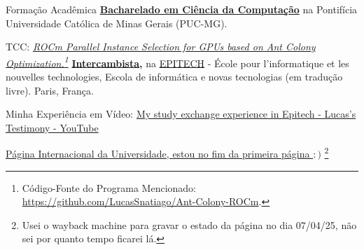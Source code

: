 \begin{rubric}{Formação Acadêmica}
\entry*[2019 -- 2023]%
    \textbf{\href{https://drive.google.com/file/d/1c2m8jONNZnZUBY8lnjcAZ_gO1ZWcIsyu/view?usp=sharing}{Bacharelado em Ciência da Computação}} na Pontifícia Universidade Católica de Minas Gerais (PUC-MG).
    \par TCC: \emph{\href{https://media.githubusercontent.com/media/LucasSnatiago/TCC/main/main.pdf}
    {ROCm Parallel Instance Selection for GPUs based on Ant Colony Optimization.}\footnote{Código-Fonte do Programa Mencionado: \href{https://github.com/LucasSnatiago/Ant-Colony-ROCm}{https://github.com/LucasSnatiago/Ant-Colony-ROCm}.}}
%
\entry*[2023/1]%
    \textbf{\href{https://drive.google.com/file/d/18yGVDfS8qOwmM7TXN-m8jqI3r0iMvm-3/view?usp=sharing}{Intercambista},} na \href{https://epitech.eu/}{EPITECH} - École pour l'informatique et les nouvelles technologies, Escola de informática e novas tecnologias (em tradução livre). Paris, França. \par
    Minha Experiência em Vídeo: \href{https://youtu.be/rOP5lxGcNaE}{My study exchange experience in Epitech - Lucas's Testimony - YouTube} \par
    \href{https://web.archive.org/web/20250407145959/https://international.epitech.eu/#h-voices-of-our-international-students}{Página Internacional da Universidade, estou no fim da primeira página $:)$}
    \footnote{Usei o wayback machine para gravar o estado da página no dia 07/04/25, não sei por quanto tempo ficarei lá.}
%
\end{rubric}
